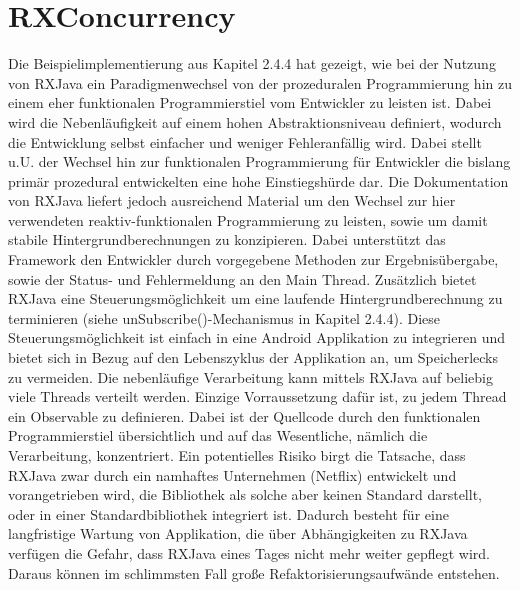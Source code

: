 \documentclass[12pt,oneside,a4paper,bibtotoc,liststotoc]{scrreprt}
\begin{document}
\section{RXConcurrency}
Die Beispielimplementierung aus Kapitel 2.4.4 hat gezeigt, wie bei der Nutzung von RXJava ein Paradigmenwechsel von der prozeduralen Programmierung hin zu einem eher funktionalen Programmierstiel vom Entwickler zu leisten ist. Dabei wird die Nebenläufigkeit auf einem hohen Abstraktionsniveau definiert, wodurch die Entwicklung selbst einfacher und weniger Fehleranfällig wird. Dabei stellt u.U. der Wechsel hin zur funktionalen Programmierung für Entwickler die bislang primär prozedural entwickelten eine hohe Einstiegshürde dar. Die Dokumentation von RXJava liefert jedoch ausreichend Material um den Wechsel zur hier verwendeten reaktiv-funktionalen Programmierung zu leisten, sowie um damit stabile Hintergrundberechnungen zu konzipieren. Dabei unterstützt das Framework den Entwickler durch vorgegebene Methoden zur Ergebnisübergabe, sowie der Status- und Fehlermeldung an den Main Thread. Zusätzlich bietet RXJava eine Steuerungsmöglichkeit um eine laufende Hintergrundberechnung zu terminieren (siehe unSubscribe()-Mechanismus in Kapitel 2.4.4). Diese Steuerungsmöglichkeit ist einfach in eine Android Applikation zu integrieren und bietet sich in Bezug auf den Lebenszyklus der Applikation an, um Speicherlecks zu vermeiden. Die nebenläufige Verarbeitung kann mittels RXJava auf beliebig viele Threads verteilt werden. Einzige Vorraussetzung dafür ist, zu jedem Thread ein Observable zu definieren. Dabei ist der Quellcode durch den funktionalen Programmierstiel übersichtlich und auf das Wesentliche, nämlich die Verarbeitung, konzentriert.\newline
Ein potentielles Risiko birgt die Tatsache, dass RXJava zwar durch ein namhaftes Unternehmen (Netflix) entwickelt und vorangetrieben wird, die Bibliothek als solche aber keinen Standard darstellt, oder in einer Standardbibliothek integriert ist. Dadurch besteht für eine langfristige Wartung von Applikation, die über Abhängigkeiten zu RXJava verfügen die Gefahr, dass RXJava eines Tages nicht mehr weiter gepflegt wird. Daraus können im schlimmsten Fall große Refaktorisierungsaufwände entstehen.
\end{document}
